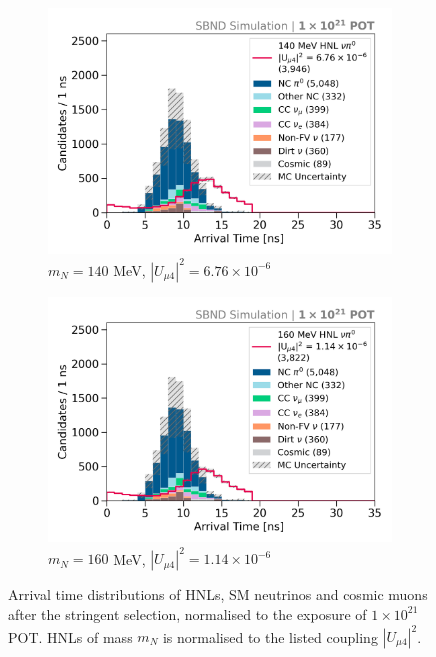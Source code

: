 \begin{figure}[hb!]
        \begin{subfigure}[b]{0.495\textwidth}
            \includegraphics[width=\textwidth]{m140}
            \caption{$m_N = 140$ MeV, $|U_{\mu4}|^2 = 6.76 \times 10^{-6}$ }
        \end{subfigure}
        \begin{subfigure}[b]{0.495\textwidth}
            \includegraphics[width=\textwidth]{m160}
            \caption{$m_N = 160$ MeV, $|U_{\mu4}|^2 = 1.14 \times 10^{-6}$ }
        \end{subfigure}
        \caption[Stringent Arrival Time Distributions in the Mass Range 140 - 160 MeV]{
	Arrival time distributions of HNLs, SM neutrinos and cosmic muons after the stringent selection, normalised to the exposure of $1 \times 10^{21}$ POT.
	HNLs of mass $m_N$ is normalised to the listed coupling $|U_{\mu4}|^2$.
	}
\end{figure}

